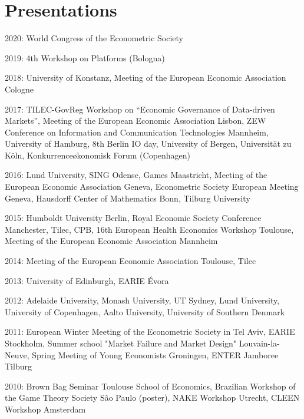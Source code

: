 \documentclass[a4paper]{article}
\renewenvironment{itemize}{
  \begin{list}{}{
    \setlength{\leftmargin}{1.5em}
  }
}{
  \end{list}
}
\begin{document}
\section*{Presentations}

\begin{itemize}
  \item 2020: World Congress of the Econometric Society
  \item 2019: 4th Workshop on Platforms (Bologna)
  \item 2018: University of Konstanz, Meeting of the European Economic Association Cologne
\item 2017: TILEC-GovReg Workshop on ``Economic Governance of Data-driven Markets'', Meeting of the European Economic Association Lisbon, ZEW Conference on Information and Communication Technologies Mannheim, University of Hamburg, 8th Berlin IO day, University of Bergen, Universit\"at zu K\"oln, Konkurrence\o konomisk Forum (Copenhagen)  
\item 2016: Lund University, SING Odense, Games Maastricht, Meeting of the European Economic Association Geneva, Econometric Society European Meeting Geneva, Hausdorff Center of Mathematics Bonn, Tilburg University
\item 2015: Humboldt University Berlin, Royal Economic Society Conference Manchester, Tilec, CPB, 16th European Health Economics Workshop Toulouse, Meeting of the European Economic Association Mannheim 
\item 2014: Meeting of the European Economic Association Toulouse, Tilec 
\item 2013: University of Edinburgh, EARIE \'{E}vora 
\item 2012: Adelaide University, Monash University, UT Sydney, Lund
  University, University of Copenhagen, Aalto University,
  University of  Southern Denmark
\item  2011: European Winter Meeting of the Econometric Society in Tel
  Aviv, EARIE Stockholm, Summer school "Market Failure and Market
  Design" Louvain-la-Neuve, Spring Meeting of Young Economists
  Groningen, ENTER Jamboree
  Tilburg
\item  2010: Brown Bag Seminar Toulouse School of Economics, Brazilian
  Workshop of the Game Theory Society S\~{a}o Paulo (poster), NAKE Workshop
  Utrecht, CLEEN Workshop Amsterdam
\end{itemize}
\end{document}
